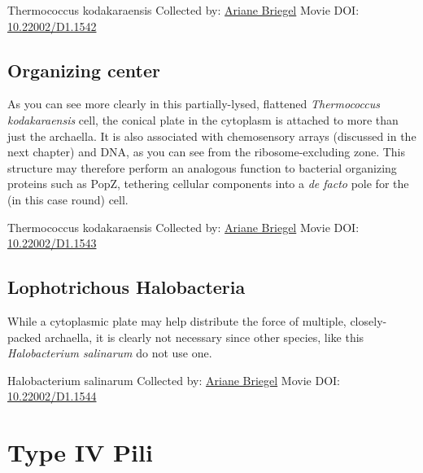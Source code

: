 \documentclass[]{tufte-book}
\begin{document}
\hypertarget{htmlwidget-0afc663ac0927107750e}{}

\label{fig:6-9a}Thermococcus kodakaraensis Collected by: \protect\hyperlink{ariane_briegel}{Ariane Briegel} Movie DOI: \href{https://doi.org/10.22002/D1.1542}{10.22002/D1.1542}

\hypertarget{Organizing_center}{%
\subsection{Organizing center}\label{Organizing_center}}

As you can see more clearly in this partially-lysed, flattened \emph{Thermococcus kodakaraensis} cell, the conical plate in the cytoplasm is attached to more than just the archaella. It is also associated with chemosensory arrays (discussed in the next chapter) and DNA, as you can see from the ribosome-excluding zone. This structure may therefore perform an analogous function to bacterial organizing proteins such as PopZ, tethering cellular components into a \emph{de facto} pole for the (in this case round) cell.



\hypertarget{htmlwidget-a5808d1ef64f0266ad96}{}

\label{fig:6-9b}Thermococcus kodakaraensis Collected by: \protect\hyperlink{ariane_briegel}{Ariane Briegel} Movie DOI: \href{https://doi.org/10.22002/D1.1543}{10.22002/D1.1543}

\hypertarget{Lophotrichous_Halobacteria}{%
\subsection{Lophotrichous Halobacteria}\label{Lophotrichous_Halobacteria}}

While a cytoplasmic plate may help distribute the force of multiple, closely-packed archaella, it is clearly not necessary since other species, like this \emph{Halobacterium salinarum} do not use one.



\hypertarget{htmlwidget-cd7ae70a46fab260ed62}{}

\label{fig:6-9c}Halobacterium salinarum Collected by: \protect\hyperlink{ariane_briegel}{Ariane Briegel} Movie DOI: \href{https://doi.org/10.22002/D1.1544}{10.22002/D1.1544}

\hypertarget{type-iv-pili}{%
\section{Type IV Pili}\label{type-iv-pili}}
\end{document}
